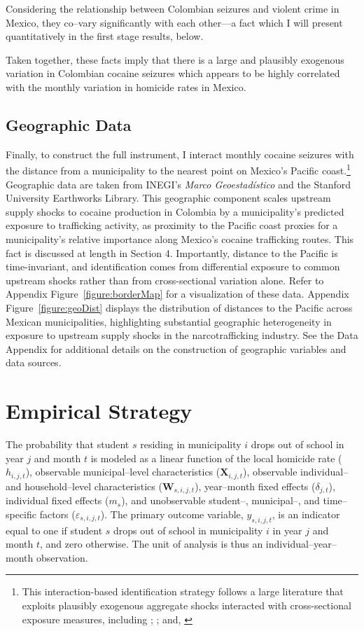 \documentclass[12pt,letter,english,intoc,bibliography=totoc,index=totoc,BCOR10mm,captions=tableheading,nottitlepage,fleqn]{article}
\theoremstyle{break}
\begin{document}
Considering the relationship between Colombian seizures and violent crime in Mexico, they co--vary significantly with each other---a fact which I will present quantitatively in the first stage results, below.

Taken together, these facts imply that there is a large and plausibly exogenous variation in Colombian cocaine seizures which appears to be highly correlated with the monthly variation in homicide rates in Mexico.  

\subsection{Geographic Data}
Finally, to construct the full instrument, I interact monthly cocaine seizures with the distance from a municipality to the nearest point on Mexico's Pacific coast.\footnote{This interaction-based identification strategy follows a large literature that exploits plausibly exogenous aggregate shocks interacted with cross-sectional exposure measures, including \citet{dubevargas}; \citet{morenolouzada2025}; and, \citet{bartik1991}} Geographic data are taken from INEGI's \textit{Marco Geoestad\'{i}stico} and the Stanford University Earthworks Library. This geographic component scales upstream supply shocks to cocaine production in Colombia by a municipality's predicted exposure to trafficking activity, as proximity to the Pacific coast proxies for a municipality's relative importance along Mexico's cocaine trafficking routes. This fact is discussed at length in Section 4. Importantly, distance to the Pacific is time-invariant, and identification comes from differential exposure to common upstream shocks rather than from cross-sectional variation alone. Refer to Appendix Figure~\ref{figure:borderMap} for a visualization of these data. Appendix Figure~\ref{figure:geoDist} displays the distribution of distances to the Pacific across Mexican municipalities, highlighting substantial geographic heterogeneity in exposure to upstream supply shocks in the narcotrafficking industry. See the Data Appendix for additional details on the construction of geographic variables and data sources.


\section{Empirical Strategy}
The probability that student $s$ residing in municipality $i$ drops out of school in year $j$ and month $t$ is modeled as a linear function of the local homicide rate ($h_{i,j,t}$), observable municipal--level characteristics ($\mathbf{X}_{i,j,t}$), observable individual-- and household--level characteristics ($\mathbf{W}_{s,i,j,t}$), year--month fixed effects ($\delta_{j,t}$), individual fixed effects ($m_s$), and unobservable student--, municipal--, and time--specific factors ($\varepsilon_{s,i,j,t}$). The primary outcome variable, $y_{s,i,j,t}$, is an indicator equal to one if student $s$ drops out of school in municipality $i$ in year $j$ and month $t$, and zero otherwise. The unit of analysis is thus an individual--year--month observation.
\end{document}
